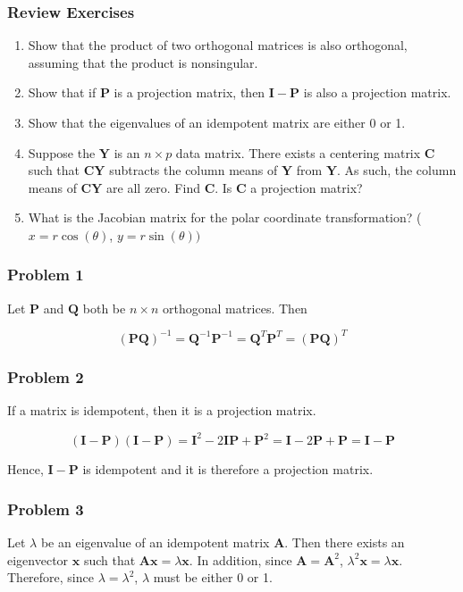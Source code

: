 \documentclass{beamer}
\begin{document}
\begin{frame}
\frametitle{Review Exercises}
\begin{enumerate}
\item Show that the product of two orthogonal matrices is also orthogonal, assuming that the product is nonsingular.

\item Show that if $\mathbf{P}$ is a projection matrix, then $\mathbf{I} - \mathbf{P}$ is also a projection matrix.

\item Show that the eigenvalues of an idempotent matrix are either 0 or 1.

\item Suppose the $\mathbf{Y}$ is an $n \times p$ data matrix.  There exists a centering matrix $\mathbf{C}$ such that $\mathbf{CY}$ subtracts the column means of $\mathbf{Y}$ from $\mathbf{Y}$.  As such, the column means of $\mathbf{CY}$ are all zero.  Find $\mathbf{C}$.  Is $\mathbf{C}$ a projection matrix?

\item What is the Jacobian matrix for the polar coordinate transformation? ($x = r \cos (\theta)$, $y = r \sin (\theta))$
\end{enumerate}
\end{frame}

\begin{frame}
\frametitle{Problem 1}
Let $\mathbf{P}$ and $\mathbf{Q}$ both be $n \times n$ orthogonal matrices.  Then

 $$(\mathbf{PQ})^{-1} = \mathbf{Q}^{-1}\mathbf{P}^{-1} = \mathbf{Q}^T \mathbf{P}^T = (\mathbf{PQ})^T$$
\end{frame}

\begin{frame}
\frametitle{Problem 2}
If a matrix is idempotent, then it is a projection matrix.

$$(\mathbf{I} - \mathbf{P})(\mathbf{I} - \mathbf{P}) = \mathbf{I}^2 - 2\mathbf{IP} + \mathbf{P}^2 = \mathbf{I} - 2\mathbf{P} + \mathbf{P} = \mathbf{I} - \mathbf{P}$$

Hence, $\mathbf{I} - \mathbf{P}$ is idempotent and it is therefore a projection matrix.
\end{frame}

\begin{frame}
\frametitle{Problem 3}
Let $\lambda$ be an eigenvalue of an idempotent matrix $\mathbf{A}$.  Then there exists an eigenvector $\mathbf{x}$ such that $\mathbf{Ax} = \lambda \mathbf{x}$.  In addition, since $\mathbf{A} = \mathbf{A}^2$, $\lambda^2 \mathbf{x} = \lambda \mathbf{x}$.  Therefore, since $\lambda = \lambda^2$, $\lambda$ must be either 0 or 1.
\end{frame}
\end{document}
